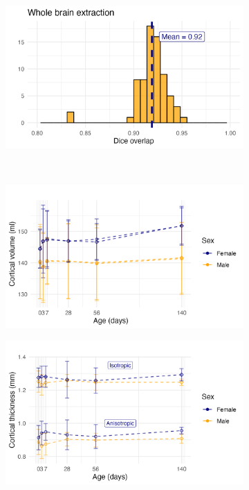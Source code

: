 \documentclass[
  12pt,
]{article}
\begin{document}
\begin{figure}
\centering
\begin{subfigure}{0.5\textwidth}
  \centering
  \includegraphics[width=\linewidth]{Figures/diceWholeBrain.png}
  \caption{}
  \label{fig:suba}
\end{subfigure}\\
\begin{subfigure}{0.5\textwidth}
  \centering
  \includegraphics[width=\linewidth]{Figures/corticoPlot.png}
  \caption{}
  \label{fig:subb}
\end{subfigure}%
\begin{subfigure}{.5\textwidth}
  \centering
  \includegraphics[width=\linewidth]{Figures/kkPlot.png}

\end{subfigure}
\end{figure}
\end{document}
